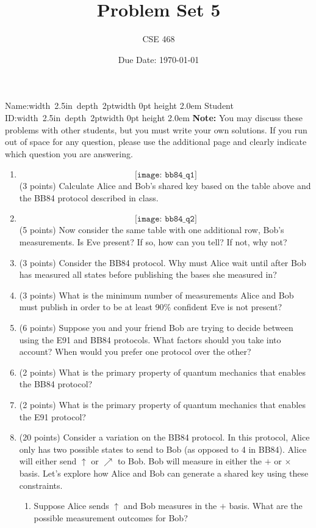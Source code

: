 \documentclass[12pt]{article}
\title{Problem Set 5}
\author{CSE 468}
\date{Due Date: \today}
\newcommand{\NameBlank}{\mbox{\hskip 4pt\vrule width 2.5in depth 2pt}\vrule width 0pt height 2.0em}
\begin{document}
\maketitle

\noindent Name:\NameBlank{} \newline
\noindent Student ID:\NameBlank{} \newline
\textbf{Note:} You may discuss these problems with other students, but you must write your own solutions. If you run out of space for any question, please use the additional page and clearly indicate which question you are answering.

\begin{enumerate}[font=\bfseries]
    \item \[\texttt{[image: bb84\_q1]}\]
    (3 points) Calculate Alice and Bob's shared key based on the table above and the BB84 protocol described in class.
    \item \[\texttt{[image: bb84\_q2]}\]
    (5 points) Now consider the same table with one additional row, Bob's measurements. Is Eve present? If so, how can you tell? If not, why not?
    \item (3 points) Consider the BB84 protocol. Why must Alice wait until after Bob has measured all states before publishing the bases she measured in?
    \item (3 points) What is the minimum number of measurements Alice and Bob must publish in order to be at least 90\% confident Eve is not present?
    \item (6 points) Suppose you and your friend Bob are trying to decide between using the E91 and BB84 protocols. What factors should you take into account? When would you prefer one protocol over the other?
    \item (2 points) What is the primary property of quantum mechanics that enables the BB84 protocol?
    \item (2 points) What is the primary property of quantum mechanics that enables the E91 protocol?
    \item (20 points) Consider a variation on the BB84 protocol. In this protocol, Alice only has two possible states to send to Bob (as opposed to 4 in BB84). Alice will either send $\uparrow$ or $\nearrow$ to Bob. Bob will measure in either the $+$ or $\times$ basis. Let's explore how Alice and Bob can generate a shared key using these constraints.
        \begin{enumerate}
            \item Suppose Alice sends $\uparrow$ and Bob measures in the $+$ basis. What are the possible measurement outcomes for Bob?

\end{enumerate}
\end{enumerate}
\end{document}
